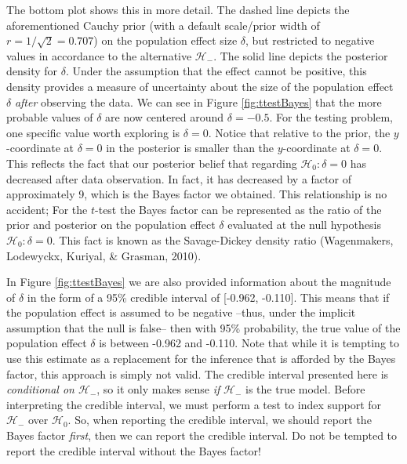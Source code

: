 \documentclass[english,,doc,floatsintext]{apa6}
\begin{document}
The bottom plot shows this in more detail. The dashed line depicts the aforementioned Cauchy prior (with a default scale/prior width of \(r=1/\sqrt{2} = 0.707\)) on the population effect size \(\delta\), but restricted to negative values in accordance to the alternative \(\mathcal{H}_{-}\). The solid line depicts the posterior density for \(\delta\). Under the assumption that the effect cannot be positive, this density provides a measure of uncertainty about the size of the population effect \(\delta\) \emph{after} observing the data. We can see in Figure \ref{fig:ttestBayes} that the more probable values of \(\delta\) are now centered around \(\delta = -0.5\). For the testing problem, one specific value worth exploring is \(\delta=0\). Notice that relative to the prior, the \(y\)-coordinate at \(\delta=0\) in the posterior is smaller than the \(y\)-coordinate at \(\delta=0\). This reflects the fact that our posterior belief that regarding \(\mathcal{H}_{0} : \delta = 0\) has decreased after data observation. In fact, it has decreased by a factor of approximately 9, which is the Bayes factor we obtained. This relationship is no accident; For the \(t\)-test the Bayes factor can be represented as the ratio of the prior and posterior on the population effect \(\delta\) evaluated at the null hypothesis \(\mathcal{H}_{0}: \delta = 0\). This fact is known as the Savage-Dickey density ratio (Wagenmakers, Lodewyckx, Kuriyal, \& Grasman, 2010).

In Figure \ref{fig:ttestBayes} we are also provided information about the magnitude of \(\delta\) in the form of a 95\% credible interval of {[}-0.962, -0.110{]}. This means that if the population effect is assumed to be negative --thus, under the implicit assumption that the null is false-- then with 95\% probability, the true value of the population effect \(\delta\) is between -0.962 and -0.110. Note that while it is tempting to use this estimate as a replacement for the inference that is afforded by the Bayes factor, this approach is simply not valid. The credible interval presented here is \emph{conditional on \(\mathcal{H}_{-}\)}, so it only makes sense \emph{if} \(\mathcal{H}_{-}\) is the true model. Before interpreting the credible interval, we must perform a test to index support for \(\mathcal{H}_{-}\) over \(\mathcal{H}_{0}\). So, when reporting the credible interval, we should report the Bayes factor \emph{first}, then we can report the credible interval. Do not be tempted to report the credible interval without the Bayes factor!
\end{document}
